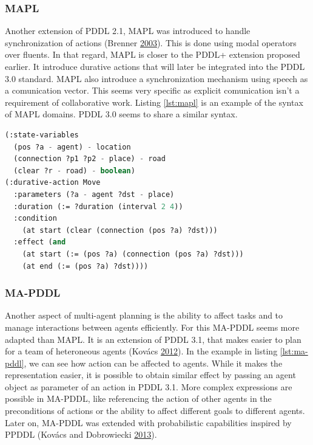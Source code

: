 \documentclass[11pt,a4paper,twoside,openright,titlepage,numbers=noenddot,headinclude,cleardoublepage=empty,openany]{scrreprt}
\theoremstyle{plain}
\theoremstyle{definition}
\theoremstyle{remark}
\begin{document}
\hypertarget{mapl}{%
\subsubsection{MAPL}\label{mapl}}

Another extension of PDDL 2.1, MAPL was introduced to handle
synchronization of actions (Brenner
\protect\hyperlink{ref-brenner_multiagent_2003}{2003}). This is done
using modal operators over fluents. In that regard, MAPL is closer to
the PDDL+ extension proposed earlier. It introduce durative actions that
will later be integrated into the PDDL 3.0 standard. MAPL also introduce
a synchronization mechanism using speech as a comunication vector. This
seems very specific as explicit comunication isn't a requirement of
collaborative work. Listing \ref{lst:mapl} is an example of the syntax
of MAPL domains. PDDL 3.0 seems to share a similar syntax.

\begin{lstlisting}[language=Lisp, caption={Example of MAPL syntax by Brenner.}, escapechar={$}, label=lst:mapl]
(:state-variables
  (pos ?a - agent) - location
  (connection ?p1 ?p2 - place) - road
  (clear ?r - road) - boolean)
(:durative-action Move
  :parameters (?a - agent ?dst - place)
  :duration (:= ?duration (interval 2 4))
  :condition
    (at start (clear (connection (pos ?a) ?dst)))
  :effect (and
    (at start (:= (pos ?a) (connection (pos ?a) ?dst)))
    (at end (:= (pos ?a) ?dst))))
\end{lstlisting}

\hypertarget{ma-pddl}{%
\subsubsection{MA-PDDL}\label{ma-pddl}}

Another aspect of multi-agent planning is the ability to affect tasks
and to manage interactions between agents efficiently. For this MA-PDDL
seems more adapted than MAPL. It is an extension of PDDL 3.1, that makes
easier to plan for a team of heteroneous agents (Kovács
\protect\hyperlink{ref-kovacs_multiagent_2012}{2012}). In the example in
listing \ref{lst:ma-pddl}, we can see how action can be affected to
agents. While it makes the representation easier, it is possible to
obtain similar effect by passing an agent object as parameter of an
action in PDDL 3.1. More complex expressions are possible in MA-PDDL,
like referencing the action of other agents in the preconditions of
actions or the ability to affect different goals to different agents.
Later on, MA-PDDL was extended with probabilistic capabilities inspired
by PPDDL (Kovács and Dobrowiecki
\protect\hyperlink{ref-kovacs_converting_2013}{2013}).
\end{document}
